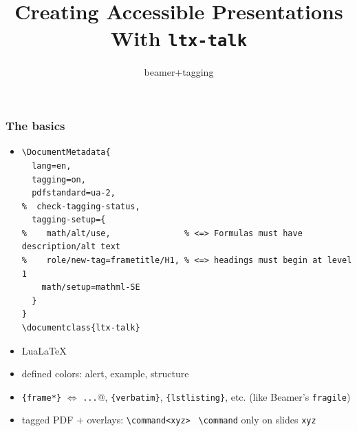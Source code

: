 \documentclass{ltx-talk}
\newcommand{\cs}[1]{\texttt{\textbackslash #1}}
\newcommand{\tubbraced}[1]{\texttt{\{#1\}}}
\begin{document}

\title[Accessible Presentations]
 {Creating Accessible Presentations With \texttt{ltx-talk}}
\subtitle{beamer+tagging}



\begin{frame*}
\frametitle{The basics}
\begin{itemize}
\item
\begin{lstlisting}
\DocumentMetadata{
  lang=en,
  tagging=on,
  pdfstandard=ua-2,
%  check-tagging-status,
  tagging-setup={
%    math/alt/use,               % <=> Formulas must have description/alt text
%    role/new-tag=frametitle/H1, % <=> headings must begin at level 1
    math/setup=mathml-SE
  }
}
\documentclass{ltx-talk}
\end{lstlisting}
\item Lua\LaTeX
\item defined colors: \textcolor{alert}{alert}, \textcolor{example}{example}, \textcolor{structure}{structure}
\item \tubbraced{frame*} $\Leftrightarrow$ \verb@\verb|...|@,
\tubbraced{verbatim}, \tubbraced{lstlisting}, etc. (like Beamer's \texttt{fragile})
\item tagged PDF + overlays: \verb|\command<xyz>| \textrightarrow\ \cs{command} only on slides \verb|xyz|
\end{itemize}
\end{frame*}
\end{document}

